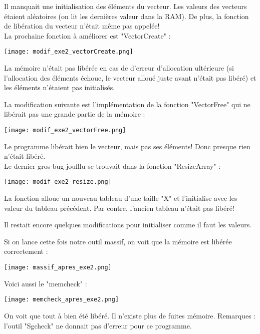Il manquait une initialisation des éléments du vecteur. Les valeurs des vecteurs étaient aléatoires (on lit les dernières valeur dans la RAM). De plus, la fonction de libération du vecteur n'était même pas appelée!\\

La prochaine fonction à améliorer est "VectorCreate" :
\begin{center} 
\hspace{15cm}
\texttt{[image: modif\_exe2\_vectorCreate.png]}
\end{center}
\vspace{0.5cm}
La mémoire n'était pas libérée en cas de d'erreur d'allocation ultérieure (si l'allocation des éléments échoue, le vecteur alloué juste avant n'était pas libéré) et les éléments n'étaient pas initialisés.
\pagebreak

La modification suivante est l'implémentation de la fonction "VectorFree" qui ne libérait pas une grande partie de la mémoire :
\begin{center} 
\hspace{15cm}
\texttt{[image: modif\_exe2\_vectorFree.png]}
\end{center}
\vspace{0.5cm}
Le programme libérait bien le vecteur, mais pas ses éléments! Donc presque rien n'était libéré.\\

Le dernier gros bug joufflu se trouvait dans la fonction "ResizeArray"  :
\begin{center} 
\hspace{15cm}
\texttt{[image: modif\_exe2\_resize.png]}
\end{center}
\vspace{0.5cm}
La fonction alloue un nouveau tableau d'une taille "X" et l'initialise avec les valeur du tableau précédent. Par contre, l'ancien tableau n'était pas libéré!

Il restait encore quelques modifications pour initialiser comme il faut les valeurs. 

\pagebreak 
Si on lance cette fois notre outil massif, on voit que la mémoire est libérée correctement : 
\begin{center} 
\hspace{15cm}
\texttt{[image: massif\_apres\_exe2.png]}
\end{center}
\vspace{0.5cm}

Voici aussi le "memcheck" : 
\begin{center} 
\hspace{15cm}
\texttt{[image: memcheck\_apres\_exe2.png]}
\end{center}
\vspace{0.5cm}
On voit que tout à bien été libéré. Il n'existe plus de fuites mémoire. Remarques :  l'outil "Sgcheck" ne donnait pas d'erreur pour ce programme.


